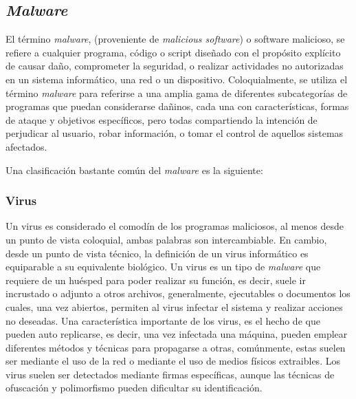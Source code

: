 \subsection{\textit{Malware}}


El término \textit{malware}, (proveniente de \textit{malicious software}) o software malicioso, se refiere a cualquier programa, código o script diseñado con el propósito explícito de causar daño, comprometer la seguridad, o realizar actividades no autorizadas en un sistema informático, una red o un dispositivo. Coloquialmente, se utiliza el término \textit{malware} para referirse a una amplia gama de diferentes subcategorías de programas que puedan considerarse dañinos, cada una con características, formas de ataque y objetivos específicos, pero todas compartiendo la intención de perjudicar al usuario, robar información, o tomar el control de aquellos sistemas afectados.

Una clasificación bastante común del \textit{malware} es la siguiente:

\subsubsection{Virus}
Un virus es considerado el comodín de los programas maliciosos, al menos desde un punto de vista coloquial, ambas palabras son intercambiable. En cambio, desde un punto de vista técnico, la definición de un virus informático es equiparable a su equivalente biológico. Un virus es un tipo de \textit{malware} que requiere de un huésped para poder realizar su función, es decir, suele ir incrustado o adjunto a otros archivos, generalmente, ejecutables o documentos los cuales, una vez abiertos, permiten al virus infectar el sistema y realizar acciones no deseadas. Una característica importante de los virus, es el hecho de que pueden auto replicarse, es decir, una vez infectada una máquina, pueden emplear diferentes métodos y técnicas para propagarse a otras, comúnmente, estas suelen ser mediante el uso de la red o mediante el uso de medios físicos extraibles. Los virus suelen ser detectados mediante firmas específicas, aunque las técnicas de ofuscación y polimorfismo pueden dificultar su identificación.

